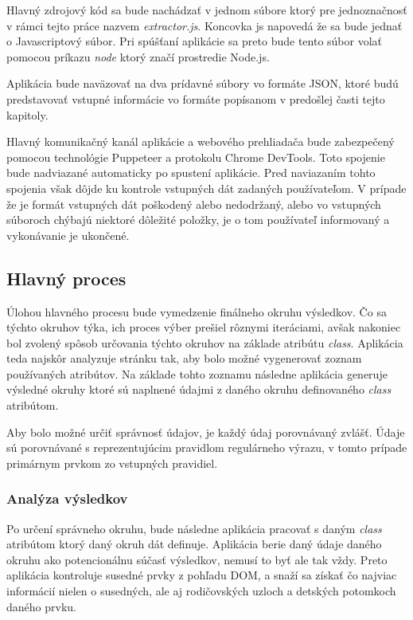Hlavný zdrojový kód sa bude nachádzať v jednom súbore ktorý pre jednoznačnosť v rámci tejto práce nazvem \textit{extractor.js}. Koncovka js napovedá že sa bude jednať o Javascriptový súbor. Pri spúšťaní aplikácie sa preto bude tento súbor volať pomocou príkazu \textit{node} ktorý značí prostredie Node.js.

Aplikácia bude naväzovať na dva prídavné súbory vo formáte JSON, ktoré budú predstavovať vstupné informácie vo formáte popísanom v predošlej časti tejto kapitoly. 

Hlavný komunikačný kanál aplikácie a webového prehliadača bude zabezpečený pomocou technológie Puppeteer a protokolu Chrome DevTools. Toto spojenie bude nadviazané automaticky po spustení aplikácie. Pred naviazaním tohto spojenia však dôjde ku kontrole vstupných dát zadaných používateľom. V prípade že je formát vstupných dát poškodený alebo nedodržaný, alebo vo vstupných súboroch chýbajú niektoré dôležité položky, je o tom používateľ informovaný a vykonávanie je ukončené.

\subsection{Hlavný proces}

Úlohou hlavného procesu bude vymedzenie finálneho okruhu výsledkov. Čo sa týchto okruhov týka, ich proces výber prešiel rôznymi iteráciami, avšak nakoniec bol zvolený spôsob určovania týchto okruhov na základe atribútu \textit{class}. Aplikácia teda najskôr analyzuje stránku tak, aby bolo možné vygenerovať zoznam používaných atribútov. Na základe tohto zoznamu následne aplikácia generuje výsledné okruhy ktoré sú naplnené údajmi z daného okruhu definovaného \textit{class} atribútom. 

Aby bolo možné určiť správnosť údajov, je každý údaj porovnávaný zvlášť. Údaje sú porovnávané s reprezentujúcim pravidlom regulárneho výrazu, v tomto prípade primárnym prvkom zo vstupných pravidiel.


\subsubsection{Analýza výsledkov}

Po určení správneho okruhu, bude následne aplikácia pracovať s daným \textit{class} atribútom ktorý daný okruh dát definuje. Aplikácia berie daný údaje daného okruhu ako potencionálnu súčasť výsledkov, nemusí to byť ale tak vždy. Preto aplikácia kontroluje susedné prvky z pohľadu DOM, a snaží sa získať čo najviac informácií nielen o susedných, ale aj rodičovských uzloch a detských potomkoch daného prvku.

